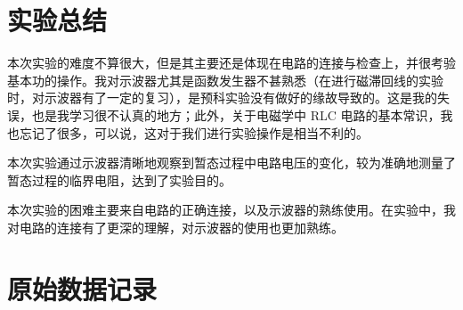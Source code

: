 \documentclass[11pt]{article}
\begin{document}
\section{实验总结}

本次实验的难度不算很大，但是其主要还是体现在电路的连接与检查上，并很考验基本功的操作。我对示波器尤其是函数发生器不甚熟悉（在进行磁滞回线的实验时，对示波器有了一定的复习），是预科实验没有做好的缘故导致的。这是我的失误，也是我学习很不认真的地方；此外，关于电磁学中 RLC 电路的基本常识，我也忘记了很多，可以说，这对于我们进行实验操作是相当不利的。

本次实验通过示波器清晰地观察到暂态过程中电路电压的变化，较为准确地测量了暂态过程的临界电阻，达到了实验目的。

本次实验的困难主要来自电路的正确连接，以及示波器的熟练使用。在实验中，我对电路的连接有了更深的理解，对示波器的使用也更加熟练。

\section{原始数据记录}


\end{document}
